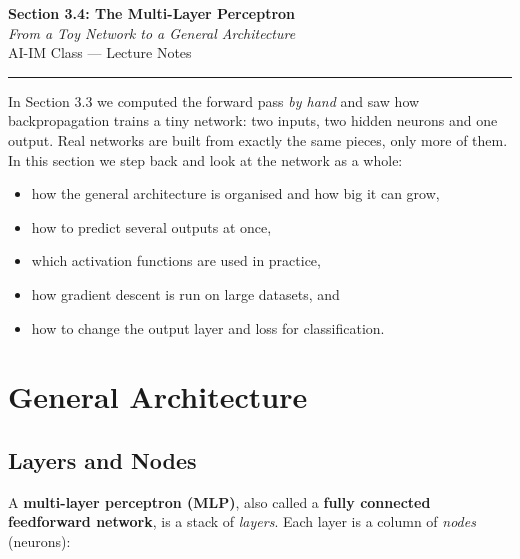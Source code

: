 \documentclass[12pt, a4paper]{article}
\begin{document}
\begin{center}
  {\LARGE \textbf{Section 3.4: The Multi-Layer Perceptron}} \\[0.3em]
  {\large\itshape From a Toy Network to a General Architecture} \\[0.5em]
  {\large AI-IM Class --- Lecture Notes}%
  \ifstudentmode
  \fi
\end{center}

\vspace{1em}
\hrule
\vspace{1.5em}

In Section 3.3 we computed the forward pass \emph{by hand} and saw how
backpropagation trains a tiny network: two inputs, two hidden neurons and one
output. Real networks are built from exactly the same pieces, only more of
them. In this section we step back and look at the network as a whole:
\begin{itemize}[nosep]
  \item how the general architecture is organised and how big it can grow,
  \item how to predict several outputs at once,
  \item which activation functions are used in practice,
  \item how gradient descent is run on large datasets, and
  \item how to change the output layer and loss for classification.
\end{itemize}

\section{General Architecture}

\subsection{Layers and Nodes}

A \textbf{multi-layer perceptron (MLP)}, also called a
\textbf{fully connected feedforward network}, is a stack of \emph{layers}.
Each layer is a column of \emph{nodes} (neurons):
\end{document}
